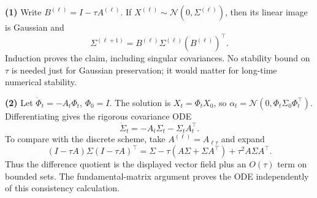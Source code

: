 \documentclass[11pt,a4paper]{article}
\theoremstyle{exostyle}
\begin{document}
\begin{solution}
\textbf{(1)} Write $B^{(\ell)}=I-\tau A^{(\ell)}$. If $X^{(\ell)}\sim\mathcal N(0,\Sigma^{(\ell)})$, then its linear image is Gaussian and
\[
\Sigma^{(\ell+1)}=B^{(\ell)}\Sigma^{(\ell)}(B^{(\ell)})^\top.
\]
Induction proves the claim, including singular covariances. No stability bound on $\tau$ is needed just for Gaussian preservation; it would matter for long-time numerical stability.

\textbf{(2)} Let $\dot\Phi_t=-A_t\Phi_t$, $\Phi_0=I$. The solution is $X_t=\Phi_tX_0$, so $\alpha_t=\mathcal N(0,\Phi_t\Sigma_0\Phi_t^\top)$. Differentiating gives the rigorous covariance ODE
\[
\dot\Sigma_t=-A_t\Sigma_t-\Sigma_tA_t^\top.
\]
To compare with the discrete scheme, take $A^{(\ell)}=A_{\ell\tau}$ and expand
\[
(I-\tau A)\Sigma(I-\tau A)^\top
=\Sigma-\tau(A\Sigma+\Sigma A^\top)+\tau^2A\Sigma A^\top.
\]
Thus the difference quotient is the displayed vector field plus an $O(\tau)$ term on bounded sets. The fundamental-matrix argument proves the ODE independently of this consistency calculation.
\end{solution}
\end{document}
